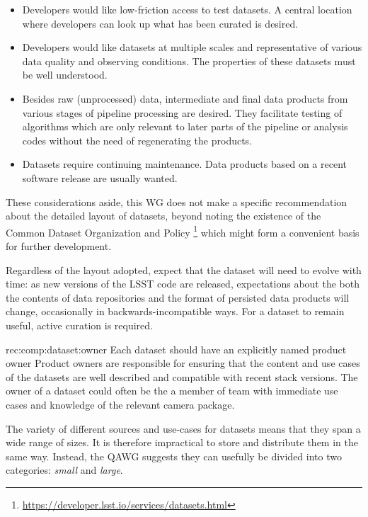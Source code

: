 \begin{itemize}
\item{
    Developers would like low-friction access to test datasets.
    A central location where developers can look up what has been curated is desired.
}
\item{
    Developers would like datasets at multiple scales and representative of various data quality and observing conditions.
    The properties of these datasets must be well understood.
}
\item{
    Besides raw (unprocessed) data, intermediate and final data products from various stages of pipeline processing are desired.
    They facilitate testing of algorithms which are only relevant to later parts of the pipeline or analysis codes without the need of regenerating the products.
}
\item{
    Datasets require continuing maintenance.
    Data products based on a recent software release are usually wanted.
}
\end{itemize}

These considerations aside, this WG does not make a specific recommendation about the detailed layout of datasets, beyond noting the existence of the Common Dataset Organization and Policy \footnote{\url{https://developer.lsst.io/services/datasets.html}} which might form a convenient basis for further development.

Regardless of the layout adopted, expect that the dataset will need to evolve with time: as new versions of the LSST code are released, expectations about the both the contents of data repositories and the format of persisted data products will change, occasionally in backwards-incompatible ways.
For a dataset to remain useful, active curation is required.

\begin{recommendation}
    {rec:comp:dataset:owner}
    {Each dataset should have an explicitly named product owner}
Product owners are responsible for ensuring that the content and use cases of the datasets are well described and compatible with recent stack versions.
The owner of a dataset could often be the a member of team with immediate use cases and knowledge of the relevant camera package.
\end{recommendation}

The variety of different sources and use-cases for datasets means that they span a wide range of sizes.
It is therefore impractical to store and distribute them in the same way.
Instead, the QAWG suggests they can usefully be divided into two categories: \emph{small} and \emph{large}.

